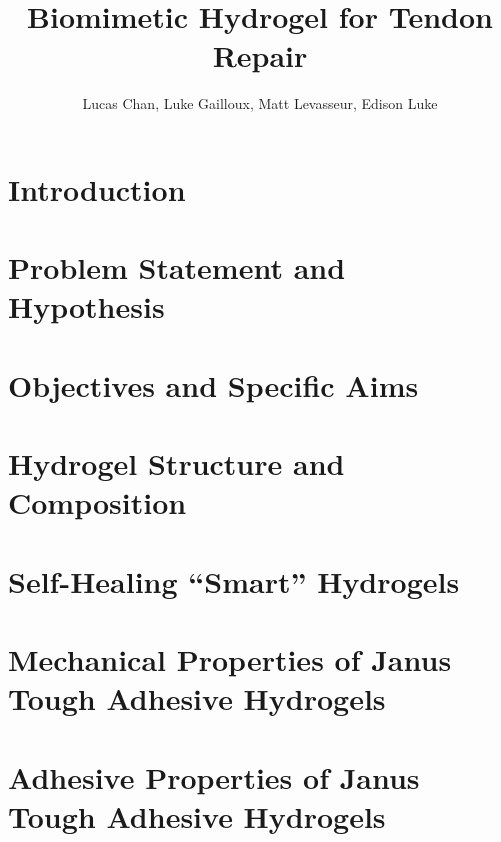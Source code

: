 \documentclass[
    letterpaper,
    10pt,
    unnumberedsections,
    twoside
]{LTJournalArticle}
\title{Biomimetic Hydrogel for Tendon Repair}
\author{Lucas Chan, Luke Gailloux, Matt Levasseur, Edison Luke}
\begin{document}
    \maketitle 

    \section{Introduction}

    

    \section{Problem Statement and Hypothesis}

    
    
    \section{Objectives and Specific Aims}

    

    \section{Hydrogel Structure and Composition}

    

    

    \section{Self-Healing ``Smart'' Hydrogels}

    

    \section{Mechanical Properties of Janus Tough Adhesive Hydrogels}

    

    \section{Adhesive Properties of Janus Tough Adhesive Hydrogels}
\end{document}
